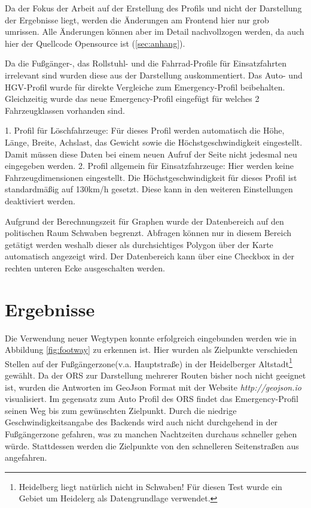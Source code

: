 \documentclass[12pt,a4paper]{article}
\begin{document}
Da der Fokus der Arbeit auf der Erstellung des Profils und nicht der Darstellung der Ergebnisse liegt, werden die Änderungen am Frontend hier nur grob umrissen. Alle Änderungen können aber im Detail nachvollzogen werden, da auch hier der Quellcode Opensource ist (\ref{sec:anhang}).

Da die Fußgänger-, das Rollstuhl- und die Fahrrad-Profile für Einsatzfahrten irrelevant sind wurden diese aus der Darstellung auskommentiert. Das Auto- und HGV-Profil wurde für direkte Vergleiche zum Emergency-Profil beibehalten.
Gleichzeitig wurde das neue Emergency-Profil eingefügt für welches 2 Fahrzeugklassen vorhanden sind.

1. Profil für Löschfahrzeuge: Für dieses Profil werden automatisch die Höhe, Länge, Breite, Achslast, das Gewicht sowie die Höchstgeschwindigkeit eingestellt. Damit müssen diese Daten bei einem neuen Aufruf der Seite nicht jedesmal neu eingegeben werden. 
2. Profil allgemein für Einsatzfahrzeuge: Hier werden keine Fahrzeugdimensionen eingestellt. Die Höchstgeschwindigkeit für dieses Profil ist standardmäßig auf 130km/h gesetzt. Diese kann in den weiteren Einstellungen deaktiviert werden.

Aufgrund der Berechnungszeit für Graphen wurde der Datenbereich auf den politischen Raum Schwaben begrenzt. Abfragen können nur in diesem Bereich getätigt werden weshalb dieser als durchsichtiges Polygon über der Karte automatisch angezeigt wird. Der Datenbereich kann über eine Checkbox in der rechten unteren Ecke ausgeschalten werden.

\newpage
\newpage
\section{Ergebnisse}

Die Verwendung neuer Wegtypen konnte erfolgreich eingebunden werden wie in Abbildung \ref{fig:footway} zu erkennen ist. Hier wurden als Zielpunkte verschieden Stellen auf der Fußgängerzone(v.a. Hauptstraße) in der Heidelberger Altstadt\footnote{Heidelberg liegt natürlich nicht in Schwaben! Für diesen Test wurde ein Gebiet um Heidelerg als Datengrundlage verwendet.} gewählt. Da der ORS zur Darstellung mehrerer Routen bisher noch nicht geeignet ist, wurden die Antworten im GeoJson Format mit der Website \textit{http://geojson.io} visualisiert. Im gegensatz zum Auto Profil des ORS findet das Emergency-Profil seinen Weg bis zum gewünschten Zielpunkt. Durch die niedrige Geschwindigkeitsangabe des Backends wird auch nicht durchgehend in der Fußgängerzone gefahren, was zu manchen Nachtzeiten durchaus schneller gehen würde. Stattdessen werden die Zielpunkte von den schnelleren Seitenstraßen aus angefahren.
\end{document}
